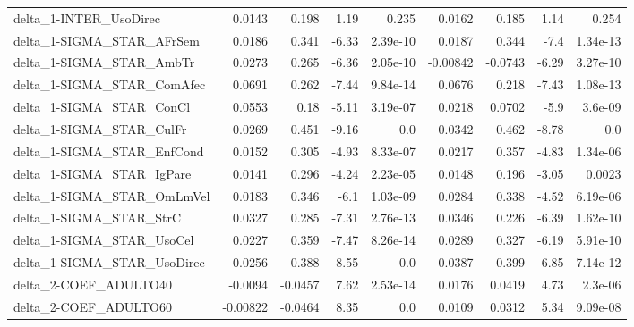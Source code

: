 \begin{tabular}{lrrrrrrrr}
delta\_1-INTER\_UsoDirec                 &      0.0143 &        0.198 &     1.19 &    0.235 &     0.0162 &       0.185 &         1.14 &         0.254 \\
delta\_1-SIGMA\_STAR\_AFrSem              &      0.0186 &        0.341 &    -6.33 & 2.39e-10 &     0.0187 &       0.344 &         -7.4 &      1.34e-13 \\
delta\_1-SIGMA\_STAR\_AmbTr               &      0.0273 &        0.265 &    -6.36 & 2.05e-10 &   -0.00842 &     -0.0743 &        -6.29 &      3.27e-10 \\
delta\_1-SIGMA\_STAR\_ComAfec             &      0.0691 &        0.262 &    -7.44 & 9.84e-14 &     0.0676 &       0.218 &        -7.43 &      1.08e-13 \\
delta\_1-SIGMA\_STAR\_ConCl               &      0.0553 &         0.18 &    -5.11 & 3.19e-07 &     0.0218 &      0.0702 &         -5.9 &       3.6e-09 \\
delta\_1-SIGMA\_STAR\_CulFr               &      0.0269 &        0.451 &    -9.16 &      0.0 &     0.0342 &       0.462 &        -8.78 &           0.0 \\
delta\_1-SIGMA\_STAR\_EnfCond             &      0.0152 &        0.305 &    -4.93 & 8.33e-07 &     0.0217 &       0.357 &        -4.83 &      1.34e-06 \\
delta\_1-SIGMA\_STAR\_IgPare              &      0.0141 &        0.296 &    -4.24 & 2.23e-05 &     0.0148 &       0.196 &        -3.05 &        0.0023 \\
delta\_1-SIGMA\_STAR\_OmLmVel             &      0.0183 &        0.346 &     -6.1 & 1.03e-09 &     0.0284 &       0.338 &        -4.52 &      6.19e-06 \\
delta\_1-SIGMA\_STAR\_StrC                &      0.0327 &        0.285 &    -7.31 & 2.76e-13 &     0.0346 &       0.226 &        -6.39 &      1.62e-10 \\
delta\_1-SIGMA\_STAR\_UsoCel              &      0.0227 &        0.359 &    -7.47 & 8.26e-14 &     0.0289 &       0.327 &        -6.19 &      5.91e-10 \\
delta\_1-SIGMA\_STAR\_UsoDirec            &      0.0256 &        0.388 &    -8.55 &      0.0 &     0.0387 &       0.399 &        -6.85 &      7.14e-12 \\
delta\_2-COEF\_ADULTO40                  &     -0.0094 &      -0.0457 &     7.62 & 2.53e-14 &     0.0176 &      0.0419 &         4.73 &       2.3e-06 \\
delta\_2-COEF\_ADULTO60                  &    -0.00822 &      -0.0464 &     8.35 &      0.0 &     0.0109 &      0.0312 &         5.34 &      9.09e-08 \\

\end{tabular}
